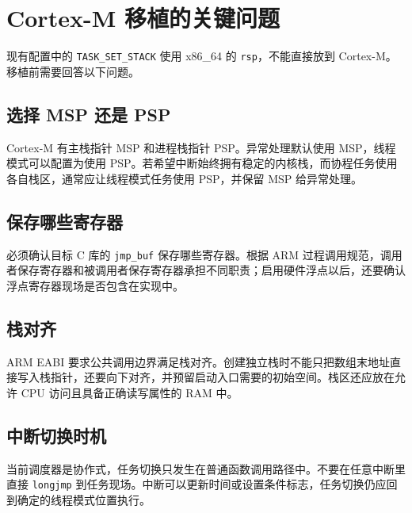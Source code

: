 \section{Cortex-M 移植的关键问题}

现有配置中的 \texttt{TASK\_SET\_STACK} 使用 x86\_64 的 \texttt{rsp}，不能直接放到 Cortex-M。移植前需要回答以下问题。

\subsection{选择 MSP 还是 PSP}

Cortex-M 有主栈指针 MSP 和进程栈指针 PSP。异常处理默认使用 MSP，线程模式可以配置为使用 PSP。若希望中断始终拥有稳定的内核栈，而协程任务使用各自栈区，通常应让线程模式任务使用 PSP，并保留 MSP 给异常处理。

\subsection{保存哪些寄存器}

必须确认目标 C 库的 \texttt{jmp\_buf} 保存哪些寄存器。根据 ARM 过程调用规范，调用者保存寄存器和被调用者保存寄存器承担不同职责；启用硬件浮点以后，还要确认浮点寄存器现场是否包含在实现中。

\subsection{栈对齐}

ARM EABI 要求公共调用边界满足栈对齐。创建独立栈时不能只把数组末地址直接写入栈指针，还要向下对齐，并预留启动入口需要的初始空间。栈区还应放在允许 CPU 访问且具备正确读写属性的 RAM 中。

\subsection{中断切换时机}

当前调度器是协作式，任务切换只发生在普通函数调用路径中。不要在任意中断里直接 \texttt{longjmp} 到任务现场。中断可以更新时间或设置条件标志，任务切换仍应回到确定的线程模式位置执行。

